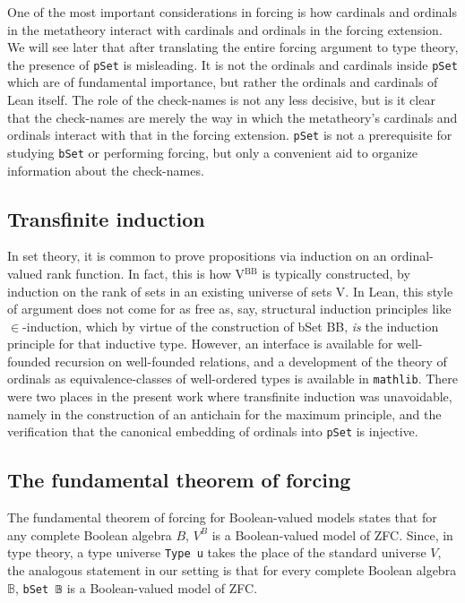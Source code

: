 \documentclass[a4paper,USenglish,cleveref, autoref]{lipics-v2019}
\newcommand{\B}{\mathbb{B}}
\begin{document}
One of the most important considerations in forcing is how cardinals and ordinals in the metatheory interact with cardinals and ordinals in the forcing extension. We will see later that after translating the entire forcing argument to type theory, the presence of \lstinline{pSet} is misleading. It is not the ordinals and cardinals inside \lstinline{pSet} which are of fundamental importance, but rather the ordinals and cardinals of Lean itself. The role of the check-names is not any less decisive, but is it clear that the check-names are merely the way in which the metatheory's cardinals and ordinals interact with that in the forcing extension. \lstinline{pSet} is not a prerequisite for studying \lstinline{bSet} or performing forcing, but only a convenient aid to organize information about the check-names.

\subsection{Transfinite induction}
\label{sec:org9e70de8}
In set theory, it is common to prove propositions via induction on an ordinal-valued rank function. In fact, this is how V\(^{\text{BB}}\) is typically constructed, by induction on the rank of sets in an existing universe of sets V. In Lean, this style of argument does not come for as free as, say, structural induction principles like $\in$-induction, which by virtue of the construction of bSet BB, \emph{is} the induction principle for that inductive type. However, an interface is available for well-founded recursion on well-founded relations, and a development of the theory of ordinals as equivalence-classes of well-ordered types is available in \texttt{mathlib}. There were two places in the present work where transfinite induction was unavoidable, namely in the construction of an antichain for the maximum principle, and the verification that the canonical embedding of ordinals into \texttt{pSet} is injective.

\subsection{The fundamental theorem of forcing}

The fundamental theorem of forcing for Boolean-valued models \cite{hamkins-seabold1} states that for any complete Boolean algebra $B$, $V^B$ is a Boolean-valued model of ZFC. Since, in type theory, a type universe \lstinline{Type u} takes the place of the standard universe $V$, the analogous statement in our setting is that for every complete Boolean algebra $\B$, \lstinline{bSet 𝔹} is a Boolean-valued model of ZFC.
\end{document}
